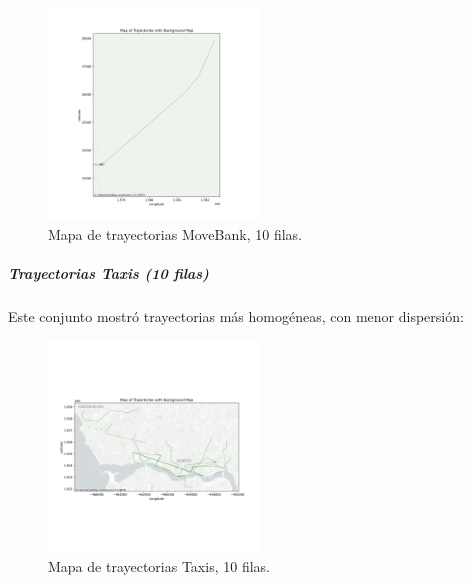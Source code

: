 \begin{figure}[h!]
    \centering
    \includegraphics[width=0.5\textwidth]{img/Movebank/map_prueba_10datos.png}
    \caption{Mapa de trayectorias MoveBank, 10 filas.}
    \label{fig:movebank_10}
\end{figure}

\subparagraph{Trayectorias Taxis (10 filas)}

Este conjunto mostró trayectorias más homogéneas, con menor dispersión:

\begin{figure}[h!]
    \centering
    \includegraphics[width=0.5\textwidth]{img/Taxis/map_prueba_10datos.png}
    \caption{Mapa de trayectorias Taxis, 10 filas.}
    \label{fig:taxis_10}
\end{figure}

